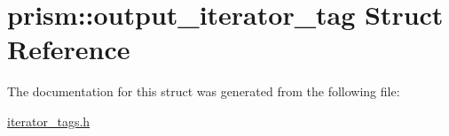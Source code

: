 \hypertarget{structprism_1_1output__iterator__tag}{}\section{prism\+:\+:output\+\_\+iterator\+\_\+tag Struct Reference}
\label{structprism_1_1output__iterator__tag}


The documentation for this struct was generated from the following file\+:\begin{DoxyCompactItemize}
\item 
\hyperlink{iterator__tags_8h}{iterator\+\_\+tags.\+h}\end{DoxyCompactItemize}
